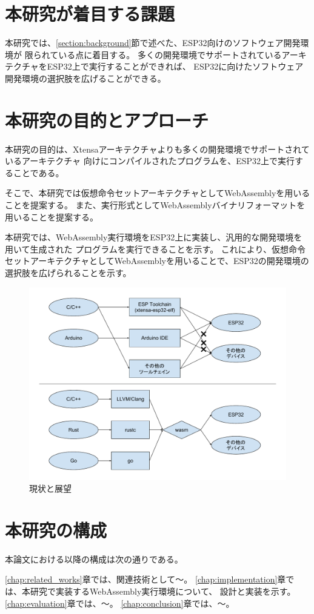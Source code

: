 \section{本研究が着目する課題}

本研究では、\ref{section:background}節で述べた、ESP32向けのソフトウェア開発環境が
限られている点に着目する。
多くの開発環境でサポートされているアーキテクチャをESP32上で実行することができれば、
ESP32に向けたソフトウェア開発環境の選択肢を広げることができる。

\section{本研究の目的とアプローチ}

本研究の目的は、Xtensaアーキテクチャよりも多くの開発環境でサポートされているアーキテクチャ
向けにコンパイルされたプログラムを、ESP32上で実行することである。

そこで、本研究では仮想命令セットアーキテクチャとしてWebAssemblyを用いることを提案する。
また、実行形式としてWebAssemblyバイナリフォーマットを用いることを提案する。

本研究では、WebAssembly実行環境をESP32上に実装し、汎用的な開発環境を用いて生成された
プログラムを実行できることを示す。
これにより、仮想命令セットアーキテクチャとしてWebAssemblyを用いることで、ESP32の開発環境の
選択肢を広げられることを示す。

\begin{figure}[htbp]
  \caption{現状と展望}
  \label{fig:new_world}
  \begin{center}
    \includegraphics[bb=0 0 800 600,width=12cm]{img/new_world.pdf}
  \end{center}
\end{figure}

\section{本研究の構成}

本論文における以降の構成は次の通りである。

\ref{chap:related_works}章では、関連技術として〜。
\ref{chap:implementation}章では、本研究で実装するWebAssembly実行環境について、
設計と実装を示す。
\ref{chap:evaluation}章では、〜。
\ref{chap:conclusion}章では、〜。
